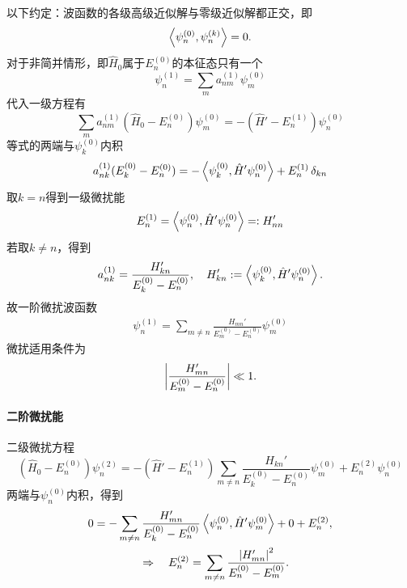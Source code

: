 以下约定：波函数的各级高级近似解与零级近似解都正交，即
\[
	\left\langle \psi_n^{(0)},\psi_n^{(k)}\right\rangle=0.
\]
对于非简并情形，即$\hat H_0$属于$E_n^{(0)}$的本征态只有一个
\[
	\psi_n^{(1)}=\sum_ma_{nm}^{(1)}\psi_m^{(0)}
\]
代入一级方程有
\[
	\sum_ma_{nm}^{(1)}(\hat H_0-E_n^{(0)})\psi_m^{(0)}=-(\hat H'-E_n^{(1)})\psi_n^{(0)}
\]
等式的两端与$\psi_k^{(0)}$内积
\[
a_{nk}^{(1)}(E_k^{(0)}-E_n^{(0)})=-\left\langle \psi_k^{(0)},\hat H'\psi_n^{(0)}\right\rangle+E_n^{(1)}\mathop{}\!\delta_{kn}
\]
取$k=n$得到一级微扰能
\begin{align}
	E_n^{(1)}=\left\langle \psi_n^{(0)},\hat H'\psi_n^{(0)}\right\rangle=:H_{nn}'
\end{align}
若取$k\neq n$，得到
\begin{align}
	a_{nk}^{(1)}=\frac{H_{kn}'}{E_k^{(0)}-E_n^{(0)}},\quad H_{kn}':=\left\langle \psi_k^{(0)},\hat H'\psi_n^{(0)}\right\rangle.
\end{align}
故一阶微扰波函数
\begin{align}
	\psi_n^{(1)}=\sum_{m\neq n}\frac{H_{mn}'}{E_m^{(0)}-E_n^{(0)}}\psi_m^{(0)}
\end{align}
微扰适用条件为
\begin{align}
	\left\lvert\frac{H_{mn}'}{E_m^{(0)}-E_n^{(0)}}\right\rvert\ll 1.
\end{align}
\paragraph*{二阶微扰能}二级微扰方程
\[
	(\hat H_0-E_n^{(0)})\psi_n^{(2)}=-(\hat H'-E_n^{(1)})\sum_{m\neq n}\frac{H_{kn}'}{E_k^{(0)}-E_n^{(0)}}\psi_m^{(0)}+E_n^{(2)}\psi_n^{(0)}
\]
两端与$\psi_n^{(0)}$内积，得到
\begin{gather}\notag
	0=-\sum_{m\neq n}\frac{H_{mn}'}{E_k^{(0)}-E_n^{(0)}}\left\langle \psi_n^{(0)},\hat H'\psi_m^{(0)}\right\rangle+0+E_n^{(2)},\\
	\quad\Rightarrow\quad E_n^{(2)}=\sum_{m\neq n}\frac{\left\lvert H_{mn}'\right\rvert^2}{E_n^{(0)}-E_m^{(0)}}.
\end{gather}

